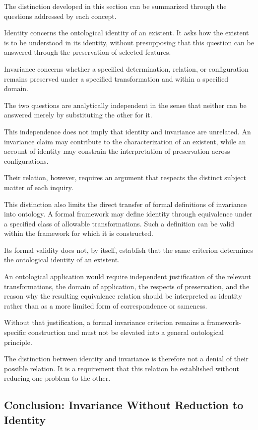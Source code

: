 The distinction developed in this section can
be summarized through the questions addressed
by each concept.

Identity concerns the ontological identity of
an existent. It asks how the existent is to be
understood in its identity, without presupposing
that this question can be answered through the
preservation of selected features.

Invariance concerns whether a specified determination,
relation, or configuration remains preserved under
a specified transformation and within a specified
domain.

The two questions are analytically independent
in the sense that neither can be answered merely
by substituting the other for it.

This independence does not imply that identity
and invariance are unrelated. An invariance claim
may contribute to the characterization of an
existent, while an account of identity may constrain
the interpretation of preservation across
configurations.

Their relation, however, requires an argument
that respects the distinct subject matter of
each inquiry.

This distinction also limits the direct transfer
of formal definitions of invariance into ontology.
A formal framework may define identity through
equivalence under a specified class of allowable
transformations. Such a definition can be valid
within the framework for which it is constructed.

Its formal validity does not, by itself, establish
that the same criterion determines the ontological
identity of an existent.

An ontological application would require independent
justification of the relevant transformations,
the domain of application, the respects of
preservation, and the reason why the resulting
equivalence relation should be interpreted as
identity rather than as a more limited form
of correspondence or sameness.

Without that justification, a formal invariance
criterion remains a framework-specific construction
and must not be elevated into a general ontological
principle.

The distinction between identity and invariance
is therefore not a denial of their possible
relation. It is a requirement that this relation
be established without reducing one problem
to the other.

\subsection{Conclusion: Invariance Without Reduction to Identity}

